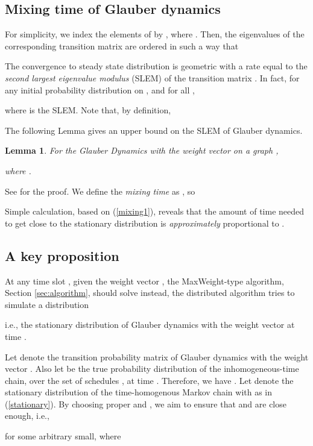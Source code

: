 \documentclass[10pt,onecolumn,draftclsnofoot,journal]{IEEEtran}
\newtheorem{lemma}{Lemma}
\begin{document}
\subsection*{Mixing time of Glauber dynamics}
For simplicity, we index the elements of  by , where .
Then, the eigenvalues of the corresponding transition matrix are ordered in such a way that

The convergence to steady state distribution is geometric with a rate equal to the \textit{second largest eigenvalue modulus} (SLEM) of the transition matrix \cite{pier}. In fact, for any initial probability distribution  on , and for all ,

where  is the SLEM.
Note that, by definition,


The following Lemma gives an upper bound on the SLEM  of Glauber dynamics.
\begin{lemma}\label{mixing2}
For the Glauber Dynamics with the weight vector  on a graph ,

where .
\end{lemma}
See \cite{ghaderi} for the proof. We define the \textit{mixing time} as , so

Simple calculation, based on (\ref{mixing1}), reveals that the amount of time needed to get close to the stationary distribution is \textit{approximately} proportional to .
\subsection*{A key proposition}
At any time slot , given the weight vector , the MaxWeight-type algorithm, Section \ref{sec:algorithm}, should solve 
instead, the distributed algorithm tries to simulate a distribution

i.e., the stationary distribution of Glauber dynamics with the weight vector  at time .

Let  denote the transition probability matrix of Glauber dynamics with the weight vector .
Also let  be the true probability distribution of the inhomogeneous-time chain, over the set of schedules , at time  .
Therefore, we have . Let  denote the stationary distribution of the time-homogenous Markov chain with  as in (\ref{stationary}).
By choosing proper  and , we aim to ensure that  and  are close enough, i.e.,

for some  arbitrary small, where
\end{document}
